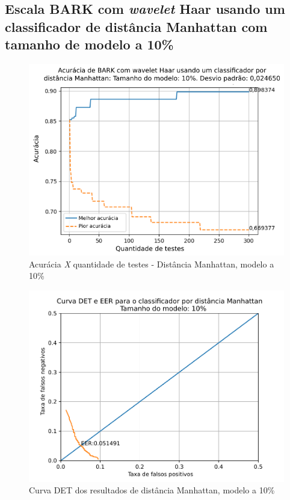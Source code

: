 			\FloatBarrier
		\subsection{Escala BARK com \textit{wavelet} Haar usando um classificador de distância Manhattan com tamanho de modelo a 10\%}
		
			
	
			\begin{figure}[ht]
				\centering
				\includegraphics[width=\linewidth]{images/results/confusionMatrices/classifier_Manhattan_10.png}
				\caption{Acurácia \textit{X} quantidade de testes - Distância Manhattan, modelo a 10\%}
				\label{fig:classifiermanhattan10}
			\end{figure}
		
			\begin{figure}[!ht]
				\centering
				\includegraphics[width=\linewidth]{images/results/det/DET_for_classifier_Manhattan_10}
				\caption{Curva DET dos resultados de distância Manhattan, modelo a 10\%}
				\label{fig:detforclassifiermanhattan10}
			\end{figure}
	

